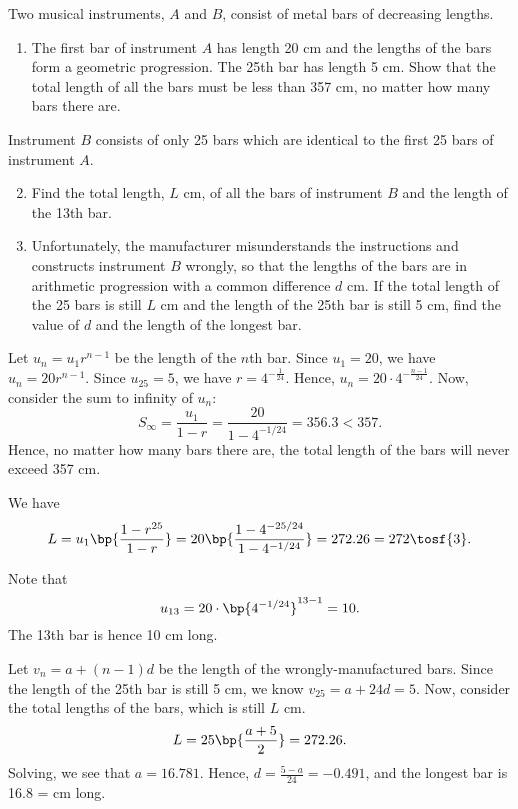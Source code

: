 \begin{problem}
    Two musical instruments, $A$ and $B$, consist of metal bars of decreasing lengths.

    \begin{enumerate}
        \item The first bar of instrument $A$ has length 20 cm and the lengths of the bars form a geometric progression. The 25th bar has length 5 cm. Show that the total length of all the bars must be less than 357 cm, no matter how many bars there are.
    \end{enumerate}

    Instrument $B$ consists of only 25 bars which are identical to the first 25 bars of instrument $A$.

    \begin{enumerate}
        \setcounter{enumi}{1}
        \item Find the total length, $L$ cm, of all the bars of instrument $B$ and the length of the 13th bar.
        \item Unfortunately, the manufacturer misunderstands the instructions and constructs instrument $B$ wrongly, so that the lengths of the bars are in arithmetic progression with a common difference $d$ cm. If the total length of the 25 bars is still $L$ cm and the length of the 25th bar is still 5 cm, find the value of $d$ and the length of the longest bar.
    \end{enumerate}
\end{problem}
\begin{solution}
    \begin{ppart}
        Let $u_n = u_1r^{n-1}$ be the length of the $n$th bar. Since $u_1 = 20$, we have $u_n = 20r^{n-1}$. Since $u_{25} = 5$, we have $r = 4^{-\tfrac1{24}}$. Hence, $u_n = 20 \cdot 4^{-\tfrac{n-1}{24}}$. Now, consider the sum to infinity of $u_n$: \[S_\infty = \frac{u_1}{1 - r} = \frac{20}{1 - 4^{-1/24}} = 356.3 < 357.\] Hence, no matter how many bars there are, the total length of the bars will never exceed 357 cm.
    \end{ppart}
    \begin{ppart}
        We have \[L = u_1 \bp{\frac{1 - r^{25}}{1 - r}} = 20 \bp{\frac{1 - 4^{-25/24}}{1 - 4^{-1/24}}} = 272.26 = 272 \tosf{3}.\]
        
        Note that \[u_{13} = 20 \cdot \bp{4^{-1/24}}^{13 - 1} = 10.\] The 13th bar is hence 10 cm long.
    \end{ppart}
    \begin{ppart}
        Let $v_n = a + (n-1)d$ be the length of the wrongly-manufactured bars. Since the length of the 25th bar is still 5 cm, we know $v_{25} = a + 24d = 5$. Now, consider the total lengths of the bars, which is still $L$ cm. \[L = 25\bp{\frac{a + 5}{2}} = 272.26.\] Solving, we see that $a = 16.781$. Hence, $d = \frac{5-a}{24} = -0.491$, and the longest bar is 16.8 = cm long.
    \end{ppart}
\end{solution}

